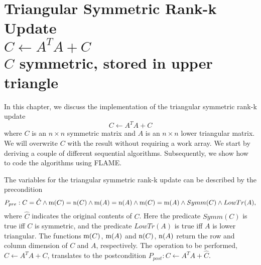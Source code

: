 

%
%

\chapter{Triangular Symmetric Rank-k Update \\
$ C \leftarrow A^T A + C $ \\
$ C $ symmetric, stored in upper triangle
}
\label{chapter:sytrrk_uln}



In this chapter, we discuss the implementation of the triangular symmetric rank-k update
\[
C \leftarrow A^T A + C
\]
where $ C $ is an $ n \times n $ symmetric matrix and $ A $ is an $ n \times n $ lower
triangular matrix. We will overwrite $ C $ with the result without requiring a work array.
We start by deriving a couple of different sequential algorithms. Subsequently, we show how
to code the algorithms using FLAME.

The variables for the triangular symmetric rank-k update can be described by the precondition
\[
P_{pre} : C = \hat{C} \wedge \mbox{m}(C) = \mbox{n}(C) \wedge \mbox{m}(A) = \mbox{n}(A)
\wedge \mbox{m}(C) = \mbox{m}(A) \wedge Symm(C) \wedge LowTr(A),
\]
where $ \hat{C} $ indicates the original contents of $ C $. Here the predicate $ Symm(C) $
is true iff $ C $ is symmetric, and the predicate $ LowTr(A) $ is true iff $ A $ is lower
triangular. The functions $ \mbox{m}(C) $, $ \mbox{m}(A) $  and $ \mbox{n}(C) $,
$ \mbox{n}(A) $ return the row and column dimension of $ C $ and $ A $, respectively. The
operation to be performed, $ C \leftarrow A^T A + C $, translates to the postcondition
$ P_{post} : C \leftarrow A^T A + \hat{C} $.

